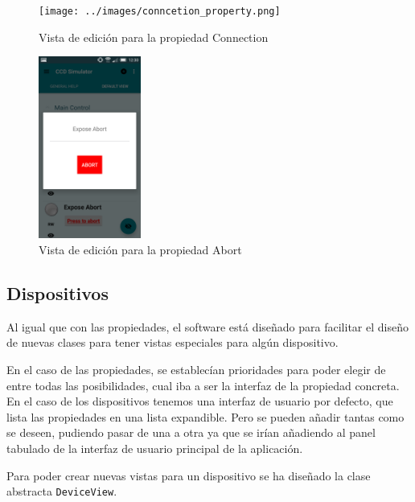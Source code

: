 \begin{figure}[!ht]
  \begin{center}
  \texttt{[image: ../images/conncetion\_property.png]}
  \caption{Vista de edición para la propiedad Connection}
  \label{fig:connect_edit_view}
  \end{center}
\end{figure}

\begin{figure}[!ht]
  \begin{center}
  \includegraphics[width=0.3\textwidth]{../images/abort_property.png}
  \caption{Vista de edición para la propiedad Abort}
  \label{fig:connect_abort}
  \end{center}
\end{figure}

\newpage
\subsection{Dispositivos}
Al igual que con las propiedades, el software está diseñado para facilitar el diseño de nuevas clases para tener vistas especiales para algún dispositivo.

\bigskip
En el caso de las propiedades, se establecían prioridades para poder elegir de entre todas las posibilidades, cual iba a ser la interfaz de la propiedad concreta. En el caso de los dispositivos tenemos una interfaz de usuario por defecto, que lista las propiedades en una lista expandible. Pero se pueden añadir tantas como se deseen, pudiendo pasar de una a otra ya que se irían añadiendo al panel tabulado de la interfaz de usuario principal de la aplicación.

Para poder crear nuevas vistas para un dispositivo se ha diseñado la clase abstracta \texttt{DeviceView}.

